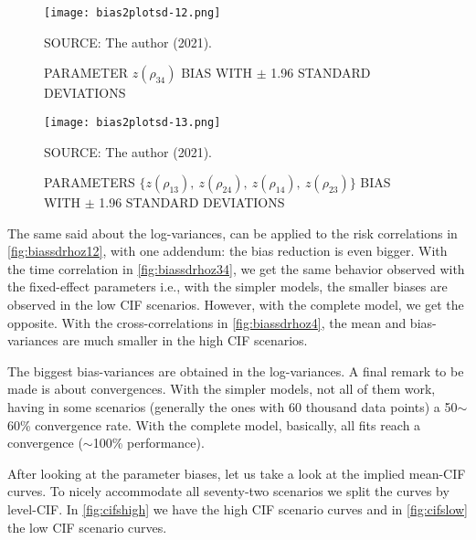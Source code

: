 \begin{figure}[H]
 \setlength{\abovecaptionskip}{.0001pt}
 \caption{PARAMETER \(z(\rho_{34})\) BIAS WITH \(\pm\) 1.96 STANDARD
          DEVIATIONS}
 \vspace{0.2cm}\centering
 \texttt{[image: bias2plotsd-12.png]}\\
 \begin{footnotesize}
  SOURCE: The author (2021).
 \end{footnotesize}
 \label{fig:biassdrhoz34}
\end{figure}

\begin{figure}[H]
 \setlength{\abovecaptionskip}{.0001pt}
 \caption{PARAMETERS
          \(\{z(\rho_{13}),~z(\rho_{24}),~z(\rho_{14}),~z(\rho_{23})\}\)
          BIAS WITH \(\pm\) 1.96 STANDARD DEVIATIONS}
 \vspace{0.2cm}\centering
 \texttt{[image: bias2plotsd-13.png]}\\
 \begin{footnotesize}
  SOURCE: The author (2021).
 \end{footnotesize}
 \label{fig:biassdrhoz4}
\end{figure}

The same said about the log-variances, can be applied to the risk
correlations in \autoref{fig:biassdrhoz12}, with one addendum: the bias
reduction is even bigger. With the time correlation in
\autoref{fig:biassdrhoz34}, we get the same behavior observed with the
fixed-effect parameters i.e., with the simpler models, the smaller
biases are observed in the low CIF scenarios. However, with the complete
model, we get the opposite. With the cross-correlations in
\autoref{fig:biassdrhoz4}, the mean and bias-variances are much smaller
in the high CIF scenarios.

The biggest bias-variances are obtained in the log-variances. A final
remark to be made is about convergences. With the simpler models, not
all of them work, having in some scenarios (generally the ones with 60
thousand data points) a 50\(\sim\)60\% convergence rate. With the
complete model, basically, all fits reach a convergence (\(\sim\)100\%
performance).

After looking at the parameter biases, let us take a look at the implied
mean-CIF curves. To nicely accommodate all seventy-two scenarios we
split the curves by level-CIF. In \autoref{fig:cifshigh} we have the
high CIF scenario curves and in \autoref{fig:cifslow} the low CIF
scenario curves.

